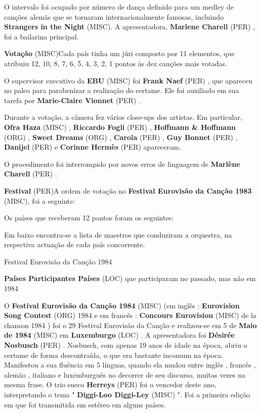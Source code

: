 \documentclass[12pt,a4paper]{article}
\begin{document}
O intervalo foi ocupado por número de dança definido para um medley de canções alemãs que se tornaram internacionalmente famosas, incluindo \textbf{Strangers in the Night} (MISC). A apresentadora, \textbf{Marlene Charell} (PER) , foi a bailarina principal.



\textbf{Votação} (MISC)Cada país tinha um júri composto por 11 elementos, que atribuiu 12, 10, 8, 7, 6, 5, 4, 3, 2, 1 pontos às dez canções mais votadas.

O supervisor executivo da \textbf{EBU} (MISC) foi \textbf{Frank Naef} (PER) , que apareceu no palco para parabenizar a realização do certame. Ele foi auxiliado em sua tarefa por \textbf{Marie-Claire Vionnet} (PER) .

Durante a votação, a câmera fez vários close-ups dos artistas. Em particular, \textbf{Ofra Haza} (MISC) , \textbf{Riccardo Fogli} (PER) , \textbf{Hoffmann \& Hoffmann} (ORG) , \textbf{Sweet Dreams} (ORG) , \textbf{Carola} (PER) , \textbf{Guy Bonnet} (PER) , \textbf{Danijel} (PER) e \textbf{Corinne Hermès} (PER) apareceram.

O procedimento foi interrompido por novos erros de linguagem de \textbf{Marlène Charell} (PER) .



\textbf{Festival} (PER)A ordem de votação no \textbf{Festival Eurovisão da Canção 1983} (MISC), foi a seguinte:

Os países que receberam 12 pontos foram os seguintes:

Em baixo encontra-se a lista de maestros que conduziram a orquestra, na respectiva actuação de cada país concorrente.



Festival Eurovisão da Canção 1984



\textbf{Países Participantes Países} (LOC) que participaram no passado, mas não em 1984

O \textbf{Festival Eurovisão da Canção 1984} (MISC) (em inglês : \textbf{Eurovision Song Contest} (ORG) 1984 e em francês : \textbf{Concours Eurovision} (MISC) de la chanson 1984 ) foi o 29 Festival Eurovisão da Canção e realizou-se em 5 de \textbf{Maio de 1984} (MISC) em \textbf{Luxemburgo} (LOC) . A apresentadora foi \textbf{Désirée Nosbusch} (PER) . Nosbusch, com apenas 19 anos de idade na época, abriu o certame de forma descontraída, o que era bastante incomum na época. Manifestou a sua fluência em 5 línguas, quando ela mudou entre inglês , francês , alemão , italiano e luxemburguês no decorrer de seu discurso, muitas vezes na mesma frase. O trio sueco \textbf{Herreys} (PER) foi o vencedor deste ano, interpretando o tema " \textbf{Diggi-Loo Diggi-Ley} (MISC) ". Foi a primeira edição em que foi transmitida em estéreo em alguns países.
\end{document}
